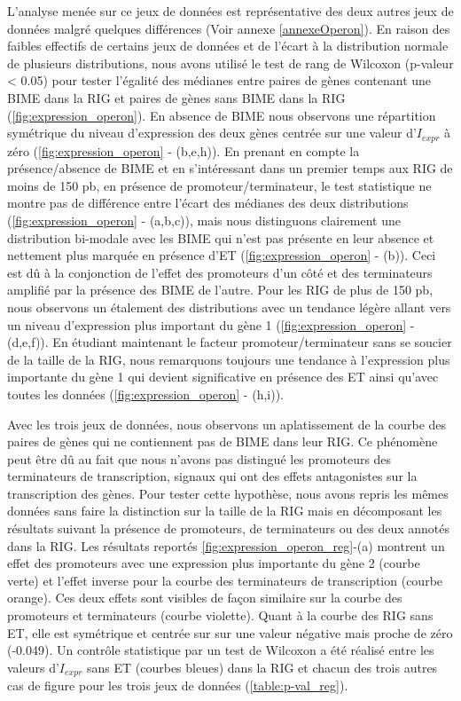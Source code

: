\documentclass[12pt,a4paper]{report}
\begin{document}
\begin{onehalfspace}
L'analyse menée sur ce jeux de données est représentative des deux autres jeux de données malgré quelques différences (Voir annexe \ref{annexeOperon}). En raison des faibles effectifs de certains jeux de données et de l’écart à la distribution normale de plusieurs distributions, nous avons utilisé le test de rang de Wilcoxon (p-valeur < 0.05) pour tester l’égalité des médianes entre paires de gènes contenant une BIME dans la RIG et paires de gènes sans BIME dans la RIG (\autoref{fig:expression_operon}).
En absence de BIME nous observons une répartition symétrique du niveau d'expression des deux gènes centrée sur une valeur d'$I_{expr}$ à zéro (\autoref{fig:expression_operon} - (b,e,h)).
En prenant en compte la présence/absence de BIME et en s'intéressant dans un premier temps aux RIG de moins de 150 pb, en présence de promoteur/terminateur, le test statistique ne montre pas de différence entre l'écart des médianes des deux distributions (\autoref{fig:expression_operon} - (a,b,c)), mais nous distinguons clairement une distribution bi-modale avec les BIME qui n'est pas présente en leur absence et nettement plus marquée en présence d'ET (\autoref{fig:expression_operon} - (b)). Ceci est dû à la conjonction de l'effet des promoteurs d'un côté et des terminateurs amplifié par la présence des BIME de l'autre.
Pour les RIG de plus de 150 pb, nous observons un étalement des distributions avec un tendance légère allant vers un niveau d'expression plus important du gène 1 (\autoref{fig:expression_operon} - (d,e,f)).
En étudiant maintenant le facteur promoteur/terminateur sans se soucier de la taille de la RIG, nous remarquons toujours une tendance à l'expression plus importante du gène 1 qui devient significative en présence des ET ainsi qu'avec toutes les données (\autoref{fig:expression_operon} - (h,i)). 

Avec les trois jeux de données, nous observons un aplatissement de la courbe des paires de gènes qui ne contiennent pas de BIME dans leur RIG. Ce phénomène peut être dû au fait que nous n’avons pas distingué les promoteurs des terminateurs de transcription, signaux qui ont des effets antagonistes sur la transcription des gènes. Pour tester cette hypothèse, nous avons repris les mêmes données sans faire la distinction sur la taille de la RIG mais en décomposant les résultats suivant la présence de promoteurs, de terminateurs ou des deux annotés dans la RIG. Les résultats reportés \autoref{fig:expression_operon_reg}-(a) montrent un effet des promoteurs avec une expression plus importante du gène 2 (courbe verte) et l'effet inverse pour la courbe des terminateurs de transcription (courbe orange). Ces deux effets sont visibles de façon similaire sur la courbe des promoteurs et terminateurs (courbe violette). Quant à la courbe des RIG sans ET, elle est symétrique et centrée sur sur une valeur négative mais proche de zéro (-0.049). Un contrôle statistique par un test de Wilcoxon a été réalisé entre les valeurs d'$I_{expr}$ sans ET (courbes bleues) dans la RIG et chacun des trois autres cas de figure pour les trois jeux de données (\autoref{table:p-val_reg}). 


\end{onehalfspace}
\end{document}
